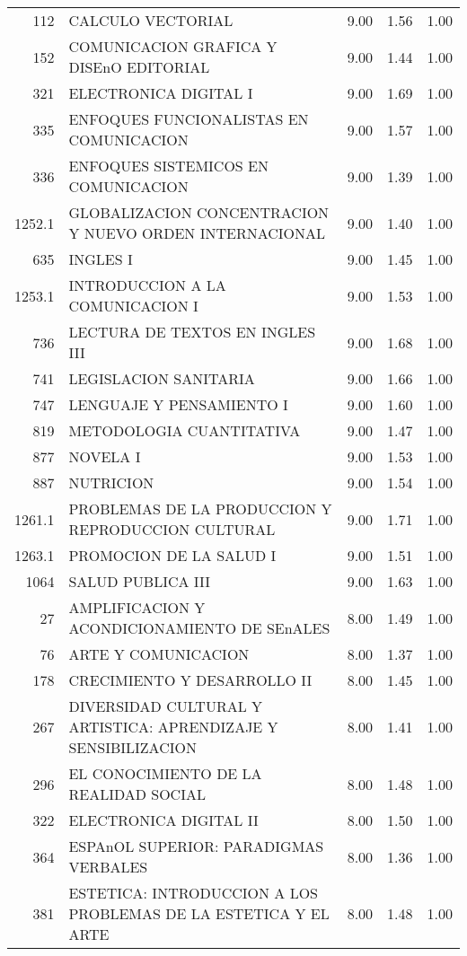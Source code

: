 \begin{table}[ht]
\begin{tabular}{rlrrr}
  112 & CALCULO VECTORIAL & 9.00 & 1.56 & 1.00 \\ 
  152 & COMUNICACION GRAFICA Y DISEnO EDITORIAL & 9.00 & 1.44 & 1.00 \\ 
  321 & ELECTRONICA DIGITAL I & 9.00 & 1.69 & 1.00 \\ 
  335 & ENFOQUES FUNCIONALISTAS EN COMUNICACION & 9.00 & 1.57 & 1.00 \\ 
  336 & ENFOQUES SISTEMICOS EN COMUNICACION & 9.00 & 1.39 & 1.00 \\ 
  1252.1 & GLOBALIZACION CONCENTRACION Y NUEVO ORDEN INTERNACIONAL & 9.00 & 1.40 & 1.00 \\ 
  635 & INGLES I & 9.00 & 1.45 & 1.00 \\ 
  1253.1 & INTRODUCCION A LA COMUNICACION I & 9.00 & 1.53 & 1.00 \\ 
  736 & LECTURA DE TEXTOS EN INGLES III & 9.00 & 1.68 & 1.00 \\ 
  741 & LEGISLACION SANITARIA & 9.00 & 1.66 & 1.00 \\ 
  747 & LENGUAJE Y PENSAMIENTO I & 9.00 & 1.60 & 1.00 \\ 
  819 & METODOLOGIA CUANTITATIVA & 9.00 & 1.47 & 1.00 \\ 
  877 & NOVELA I & 9.00 & 1.53 & 1.00 \\ 
  887 & NUTRICION & 9.00 & 1.54 & 1.00 \\ 
  1261.1 & PROBLEMAS DE LA PRODUCCION Y REPRODUCCION CULTURAL & 9.00 & 1.71 & 1.00 \\ 
  1263.1 & PROMOCION DE LA SALUD I & 9.00 & 1.51 & 1.00 \\ 
  1064 & SALUD PUBLICA III & 9.00 & 1.63 & 1.00 \\ 
  27 & AMPLIFICACION Y ACONDICIONAMIENTO DE SEnALES & 8.00 & 1.49 & 1.00 \\ 
  76 & ARTE Y COMUNICACION & 8.00 & 1.37 & 1.00 \\ 
  178 & CRECIMIENTO Y DESARROLLO II & 8.00 & 1.45 & 1.00 \\ 
  267 & DIVERSIDAD CULTURAL Y ARTISTICA: APRENDIZAJE Y SENSIBILIZACION & 8.00 & 1.41 & 1.00 \\ 
  296 & EL CONOCIMIENTO DE LA REALIDAD SOCIAL & 8.00 & 1.48 & 1.00 \\ 
  322 & ELECTRONICA DIGITAL II & 8.00 & 1.50 & 1.00 \\ 
  364 & ESPAnOL SUPERIOR: PARADIGMAS VERBALES & 8.00 & 1.36 & 1.00 \\ 
  381 & ESTETICA: INTRODUCCION A LOS PROBLEMAS DE LA ESTETICA Y EL ARTE & 8.00 & 1.48 & 1.00 \\ 

\end{tabular}
\end{table}
